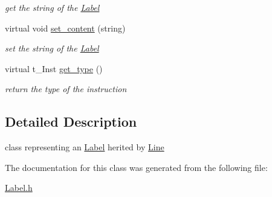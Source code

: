 \begin{DoxyCompactItemize}
\begin{DoxyCompactList}\small\item\em get the string of the \hyperlink{classLabel}{Label} \item\end{DoxyCompactList}\item 
\hypertarget{classLabel_a16f1db5a51a093f3963a2d902bce845f}{
virtual void \hyperlink{classLabel_a16f1db5a51a093f3963a2d902bce845f}{set\_\-content} (string)}
\label{classLabel_a16f1db5a51a093f3963a2d902bce845f}

\begin{DoxyCompactList}\small\item\em set the string of the \hyperlink{classLabel}{Label} \item\end{DoxyCompactList}\item 
\hypertarget{classLabel_af123355b73ac457171c3118052d145ac}{
virtual t\_\-Inst \hyperlink{classLabel_af123355b73ac457171c3118052d145ac}{get\_\-type} ()}
\label{classLabel_af123355b73ac457171c3118052d145ac}

\begin{DoxyCompactList}\small\item\em return the type of the instruction \item\end{DoxyCompactList}\end{DoxyCompactItemize}


\subsection{Detailed Description}
class representing an \hyperlink{classLabel}{Label} herited by \hyperlink{classLine}{Line} 

The documentation for this class was generated from the following file:\begin{DoxyCompactItemize}
\item 
\hyperlink{Label_8h}{Label.h}\end{DoxyCompactItemize}
